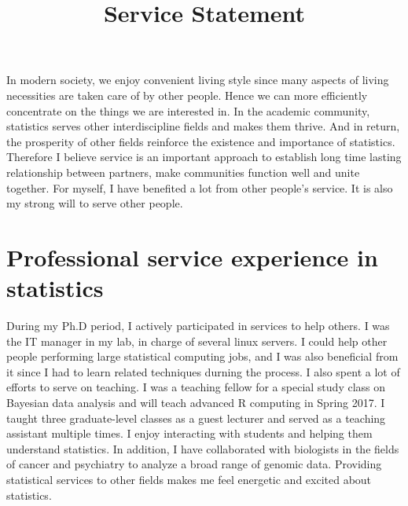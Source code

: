 \documentclass[12pt]{amsart} \usepackage{amssymb}
\title[]{Service Statement}
\begin{document}
\maketitle
\thispagestyle{empty}

In modern society, we enjoy convenient living style since many aspects of living necessities are taken care of by other people.
Hence we can more efficiently concentrate on the things we are interested in.
In the academic community,
statistics serves other interdiscipline fields and makes them thrive.
And in return, the prosperity of other fields reinforce the existence and importance of statistics.  
Therefore I believe service is an important approach to establish long time lasting relationship between partners, make communities function well and unite together.
For myself, I have benefited a lot from other people's service.
It is also my strong will to serve other people.


\section{Professional service experience in statistics}
During my Ph.D period, 
I actively participated in services to help others.
I was the IT manager in my lab, in charge of several linux servers.
I could help other people performing large statistical computing jobs, 
and I was also beneficial from it since I had to learn related techniques durning the process.
I also spent a lot of efforts to serve on teaching.
I was a teaching fellow for a special study class on Bayesian data analysis and will teach advanced R computing in Spring 2017. 
I taught three graduate-level classes as a guest lecturer and served as a teaching assistant multiple times. 
I enjoy interacting with students and helping them understand statistics.
In addition, I have collaborated with biologists in the fields of cancer and psychiatry to analyze a broad range of genomic data.
Providing statistical services to other fields makes me feel energetic and excited about statistics.
\end{document}

